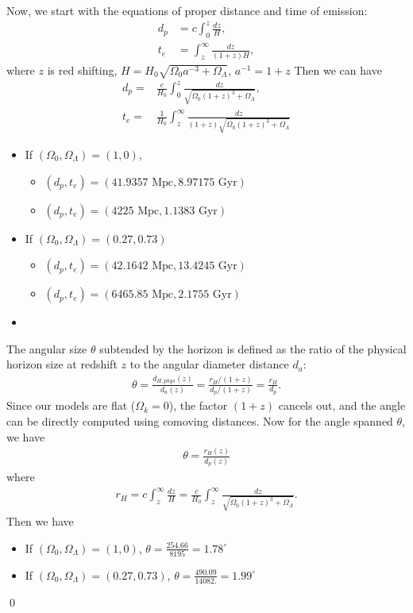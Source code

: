 \answer{}
Now, we start with the equations of proper distance and time of emission:
\begin{align}
    d_p &= c \int_0^z \frac{dz}{H},\\
    t_e &= \int_z^{\infty} \frac{dz}{(1+z)H},
\end{align}
where $z$ is red shifting, $H=H_0\sqrt{\Omega_0 a^{-3} +\Omega_\Lambda}$, $a^{-1}=1+z$ Then we can have 
\begin{align}
    d_p =&\frac{c}{H_0} \int_0^z \frac{dz}{\sqrt{\Omega_0(1+z)^3+\Omega_\Lambda}},\\
    t_e =&\frac{1}{H_0} \int_z^{\infty} \frac{dz}{(1+z)\sqrt{\Omega_0(1+z)^3+\Omega_\Lambda}}
\end{align}
\begin{itemize}
    \item [(i)] If $(\Omega_0,\Omega_\Lambda)=(1,0)$,
    \begin{itemize}
    \item [(a)] $(d_p,t_e)=(41.9357 \text{ Mpc},8.97175 \text{ Gyr})$
    \item [(b)] $(d_p,t_e)=(4225 \text{ Mpc}, 1.1383 \text{ Gyr})$
    \end{itemize}
    \item [(ii)] If $(\Omega_0,\Omega_\Lambda)=(0.27,0.73)$
    \begin{itemize}
    \item [(a)] $(d_p,t_e)=(42.1642 \text{ Mpc},13.4245 \text{ Gyr})$
    \item [(b)] $(d_p,t_e)=(6465.85 \text{ Mpc},2.1755 \text{ Gyr})$
    \end{itemize}
\end{itemize}
\begin{itemize}
    \item [(c)]
\end{itemize}
The angular size $\theta$ subtended by the horizon is defined as the ratio of the physical horizon size at redshift $z$ to the angular diameter distance $d_a$:\begin{align}\theta = \frac{d_{H,phys}(z)}{d_a(z)} = \frac{r_H / (1+z)}{d_p / (1+z)} = \frac{r_H}{d_p}.\end{align}Since our models are flat ($\Omega_k = 0$), the factor $(1+z)$ cancels out, and the angle can be directly computed using comoving distances. Now for the angle spanned $\theta$, we have 
\begin{align}
\theta = \frac{r_H(z)}{d_p(z)}
\end{align}
where 
\begin{align}
    r_H = c\int_z^\infty \frac{dz}{H} =\frac{c}{H_0} \int_z^\infty \frac{dz}{\sqrt{\Omega_0(1+z)^3+\Omega_\Lambda}}.
\end{align}
Then we have 
\begin{itemize}
    \item [(i)] If $(\Omega_0,\Omega_\Lambda)=(1,0)$, $\theta=\frac{254.66}{8195}=1.78^\circ$
    \item [(ii)] If $(\Omega_0,\Omega_\Lambda)=(0.27,0.73)$, $\theta=\frac{490.09}{14082.}=1.99^\circ$
\end{itemize}\qed




